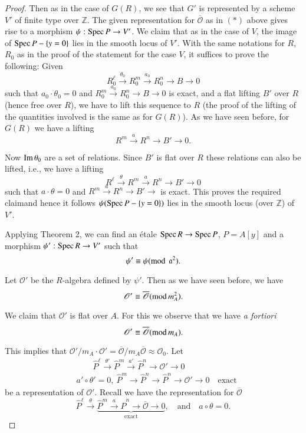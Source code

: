 \begin{proof}
Then as in the case of $G(R)$, we see that $G'$ is represented by a
scheme $V'$ of finite type over $\mathbb{Z}$. The given representation
for $\overline{\mathscr{O}}$ as in $(*)$ above gives rise to a
morphism $\psi:\operatorname{Spec} P\to V'$. We claim that as in the case of $V$,
the image of $\operatorname{Spec} P-\{y=0\}$ lies in the smooth locus of $V'$. With
the same notations for $R$, $R_{0}$ as in the proof of the statement
for the case $V$, it suffices to prove the following: Given
$$
R^{\ell}_{0}\xrightarrow{\theta_{0}}R^{m}_{0}\xrightarrow{a_{0}}R^{n}_{0}\to
B\to 0
$$
such that $a_{0}\cdot\theta_{0}=0$ and
$R_{0}^{m}\xrightarrow{a_{0}}R^{n}_{0}\to B\to 0$ is exact, and a flat
lifting $B'$ over $R$ (hence free over $R$), we have to lift this
sequence to $R$ (the proof of the lifting of the quantities involved
is the same as for $G(R)$). As we have seen before, for $G(R)$ we have
a lifting
$$
R^{m}\xrightarrow{a}R^{n}\to B'\to 0.
$$

Now $\operatorname{Im} \theta_{0}$ are a set of relations. Since $B'$ is flat over
$R$ these relations can also be lifted, i.e., we have a lifting
$$
R^{\ell}\xrightarrow{\theta}R^{m}\xrightarrow{a}R^{n}\to B'\to 0
$$
such that $a\cdot \theta=0$ and $R^{m}\xrightarrow{a}R^{n}\to B'\to $
is exact. This proves the required claim\pageoriginale and hence it
follows $\psi(\operatorname{Spec} P-\{y=0\})$ lies in the smooth locus (over
$\mathbb{Z}$) of $V'$.

Applying Theorem 2, we can find an \'etale $\operatorname{Spec} R\to
\operatorname{Spec} P$, $P=A[y]$ and a morphism $\psi':\operatorname{Spec} R\to V'$ such that
$$
\psi'\equiv \psi (\text{mod\,}~\mathfrak{a}^{2}).
$$

Let $\mathscr{O}'$ be the $R$-algebra defined by $\psi'$. Then as we
have seen before, we have
$$
\mathscr{O}'\equiv\overline{\mathscr{O}}(\text{mod\,}m^{2}_{A}).
$$

We claim that $\mathscr{O}'$ is flat over $A$. For this we observe
that we have {\em a fortiori}
$$
\mathscr{O}'\equiv\overline{\mathscr{O}}(\text{mod\,}m_{A}).
$$

This implies that $\mathscr{O}'/m_{A}\cdot
\mathscr{O}'=\overline{\mathscr{O}}/m_{A}\overline{\mathscr{O}}\approx
\mathscr{O}_{0}$. Let
\begin{equation*}
\begin{split}
 & \qquad \hat{P}^{\ell}\xrightarrow{\theta'}\hat{P}^{m}\xrightarrow{a'}\hat{P}^{n}\to
\mathscr{O}'\to 0\\
&  a' \circ \theta'=0,\ \hat{P}^{m}\to \hat{P}^{n}\to \hat{P}^{n}\to
\mathscr{O}'\to 0\quad\text{exact}
\end{split}\tag{I$'$}
\end{equation*}
be a representation of $\mathscr{O}'$. Recall we have the
representation for $\overline{\mathscr{O}}$
\begin{equation*}
\hat{P}^{\ell}\xrightarrow{\theta}\underbrace{\hat{P}^{m}\xrightarrow{a}\hat{P}^{n}\to
\overline{\mathscr{O}}\to 0}_{\text{exact}},\quad\text{and}\quad
a\circ \theta=0.\tag{I}
\end{equation*}


\end{proof}
